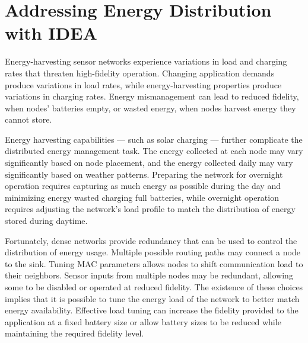 \chapter{Addressing Energy Distribution with IDEA}
\label{chapter-idea}

Energy-harvesting sensor networks experience variations in load and charging
rates that threaten high-fidelity operation. Changing application demands
produce variations in load rates, while energy-harvesting properties produce
variations in charging rates. Energy mismanagement can lead to reduced
fidelity, when nodes' batteries empty, or wasted energy, when nodes harvest
energy they cannot store.

Energy harvesting capabilities --- such as solar charging --- further
complicate the distributed energy management task. The energy collected at
each node may vary significantly based on node placement, and the energy
collected daily may vary significantly based on weather patterns. Preparing
the network for overnight operation requires capturing as much energy as
possible during the day and minimizing energy wasted charging full batteries,
while overnight operation requires adjusting the network's load profile to
match the distribution of energy stored during daytime.

\vfill\eject

Fortunately, dense networks provide redundancy that can be used to control
the distribution of energy usage. Multiple possible routing paths may connect
a node to the sink. Tuning MAC parameters allows nodes to shift communication
load to their neighbors. Sensor inputs from multiple nodes may be redundant,
allowing some to be disabled or operated at reduced fidelity. The existence
of these choices implies that it is possible to tune the energy load of the
network to better match energy availability. Effective load tuning can
increase the fidelity provided to the application at a fixed battery size or
allow battery sizes to be reduced while maintaining the required fidelity
level.

